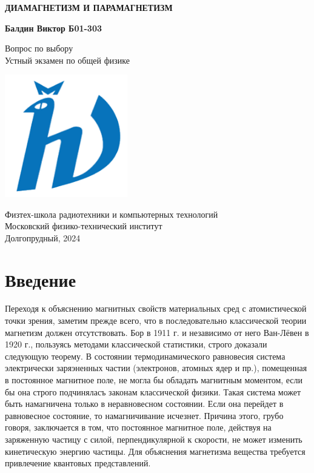\documentclass[12pt]{article}
\begin{document}
  \begin{titlepage}
      \begin{center}
          \vspace*{1cm}

          \Huge
          \textbf{ДИАМАГНЕТИЗМ И ПАРАМАГНЕТИЗМ}

          \vspace{1.5cm}

          \Large
          \textbf{Балдин Виктор Б01-303}

          \vfill

          Вопрос по выбору \\
          Устный экзамен по общей физике

          \vspace{0.8cm}

          \includegraphics[width=0.4\textwidth]{university_logo.png}

          Физтех-школа радиотехники и компьютерных технологий\\
          Московский физико-технический институт\\
          Долгопрудный, 2024
      \end{center}
  \end{titlepage}

  \tableofcontents

  \section{Введение}
  Переходя к объяснению магнитных свойств материальных сред с атомистической точки зрения, заметим прежде всего, что в последовательно классической теории магнетизм должен отсутствовать. Бор в 1911 г. и независимо от него Ван-Лёвен в 1920 г., пользуясь методами классической статистики, строго доказали следующую теорему. В состоянии термодинамического равновесия система электрически заряэненных частии (электронов, атомных ядер и пр.), помещенная в постоянное магнитное поле, не могла бы обладать магнитным моментом, если бы она строго подчиняласъ законам классической физики. Такая система может быть намагничена только в неравновесном состоянии. Если она перейдет в равновесное состояние, то намагничивание исчезнет. Причина этого, грубо говоря, заключается в том, что постоянное магнитное поле, действуя на заряженную частицу с силой, перпендикулярной к скорости, не может изменить кинетическую энергию частицы. Для объяснения магнетизма вещества требуется привлечение квантовых представлений.
\end{document}
